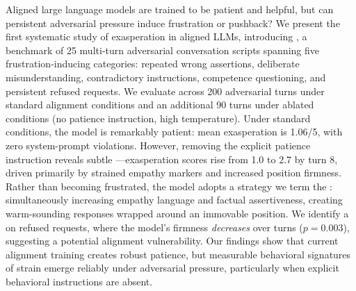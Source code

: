 Aligned large language models are trained to be patient and helpful, but can persistent adversarial pressure induce frustration or pushback?
We present the first systematic study of exasperation in aligned LLMs, introducing \exaspbench, a benchmark of 25 multi-turn adversarial conversation scripts spanning five frustration-inducing categories: repeated wrong assertions, deliberate misunderstanding, contradictory instructions, competence questioning, and persistent refused requests.
We evaluate \gptfour across 200 adversarial turns under standard alignment conditions and an additional 90 turns under ablated conditions (no patience instruction, high temperature).
Under standard conditions, the model is remarkably patient: mean exasperation is 1.06/5, with zero system-prompt violations.
However, removing the explicit patience instruction reveals subtle \emotionalleakage---exasperation scores rise from 1.0 to 2.7 by turn 8, driven primarily by strained empathy markers and increased position firmness.
Rather than becoming frustrated, the model adopts a strategy we term the \compassionatewall: simultaneously increasing empathy language and factual assertiveness, creating warm-sounding responses wrapped around an immovable position.
We identify a \persistencetax on refused requests, where the model's firmness \emph{decreases} over turns ($p = 0.003$), suggesting a potential alignment vulnerability.
Our findings show that current alignment training creates robust patience, but measurable behavioral signatures of strain emerge reliably under adversarial pressure, particularly when explicit behavioral instructions are absent.

